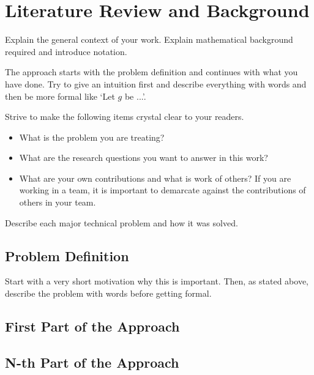 \chapter{Literature Review and Background}\label{chap:background}
Explain the general context of your work.
Explain mathematical background required and introduce notation.



The approach starts with the problem definition and continues with what you have done. Try to give an intuition first and describe everything with words and then be more formal like `Let $g$ be ...'.

Strive to make the following items crystal clear to your readers.
\begin{itemize}
\item What is the problem you are treating?
\item What are the research questions you want to answer in this work?
\item What are your own contributions and what is work of others? If
  you are working in a team, it is important to demarcate against the
  contributions of others in your team.
\end{itemize}

Describe each major technical problem and how it was solved.

\section{Problem Definition}
Start with a very short motivation why this is important. Then, as stated above, describe the problem with words before getting formal.

\section{First Part of the Approach}

\section{N-th Part of the Approach}
